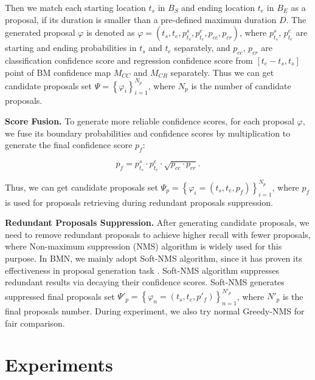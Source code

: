 \documentclass[10pt,twocolumn,letterpaper]{article}
\begin{document}
Then we match each starting location $t_s$ in $B_S$ and ending location $t_e$ in $B_E$ as a  proposal, if its duration is smaller than a pre-defined maximum duration $D$.
%
The generated  proposal $\varphi$ is denoted as  $\varphi =(t_{s},t_{e},p_{t_{s}}^s,p_{t_{e}}^e,p_{cc},p_{cr})$, where $p_{t_{s}}^s$, $p_{t_{e}}^e$ are starting and ending probabilities in $t_{s}$ and $t_{e}$ separately, and $p_{cc}$, $p_{cr}$ are classification confidence score and regression confidence score from $[t_e-t_s,t_s]$ point of BM confidence map $M_{CC}$ and $M_{CR}$ separately.
%
Thus we can get candidate proposals set $\Psi=\left \{ \varphi_i \right \}_{i=1}^{N_p}$, where $N_p$ is the number of candidate proposals.

\noindent
\textbf{Score Fusion.}
%
To generate more reliable confidence scores, for each proposal $\varphi$, we fuse its boundary probabilities and confidence scores by multiplication to generate the final confidence score $p_f$:

\begin{equation}
p_f = p_{t_{s}}^s \cdot p_{t_{e}}^e \cdot \sqrt{p_{cc}\cdot p_{cr}}.
\end{equation}

Thus, we can get candidate proposals set $\Psi_p=\left \{ \varphi_i = (t_s,t_e,p_f) \right \}_{i=1}^{N_p}$, where $p_f$ is used for proposals retrieving during redundant proposals suppression. %


\noindent
\textbf{Redundant Proposals Suppression.}
%
After generating candidate proposals, we need to remove redundant proposals to achieve higher recall with fewer proposals, where Non-maximum suppression (NMS) algorithm is widely used for this purpose.
%
In BMN, we mainly adopt Soft-NMS algorithm\cite{softNMS}, since it has proven its effectiveness in proposal generation task \cite{lin2018bsn}. Soft-NMS algorithm suppresses redundant results via decaying their confidence scores.
%
Soft-NMS generates suppressed final proposals set $\Psi'_p  = \left \{ \varphi  _n=(t_s,t_e,p'_f  ) \right \}_{n=1}^{N'_p}$, where $N'_p$ is the final proposals number.
%
During experiment, we also try normal Greedy-NMS for fair comparison.

\section{Experiments}
\end{document}

